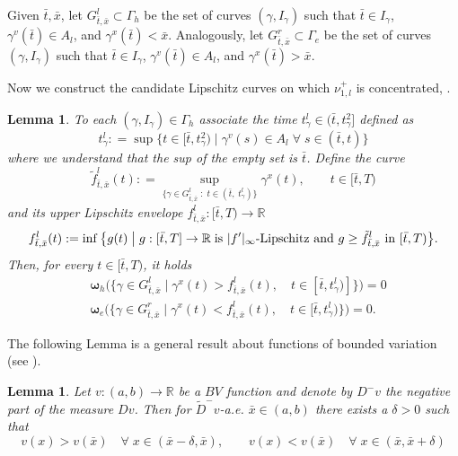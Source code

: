 \documentclass[11pt, twoside, reqno]{amsart}
\newtheorem{lemma}[thm]{Lemma}
\theoremstyle{definition}
\theoremstyle{remark}
\numberwithin{equation}{section}
\newcommand{\bs}[1]{\boldsymbol{#1}}
\begin{document}
Given $\bar t, \bar x$, let $G^l_{\bar t,\bar x}\subset \Gamma_h$ be the set of curves $(\gamma, I_{\gamma})$ such that $\bar t \in I_{\gamma}$, $\gamma^v(\bar t) \in A_l$, and $\gamma^x(\bar t) < \bar x$. Analogously, let $G^r_{\bar t,\bar x}\subset \Gamma_e$ be the set of curves $(\gamma, I_{\gamma})$ such that $\bar t \in I_{\gamma}$, $\gamma^v(\bar t) \in A_l$, and $\gamma^x(\bar t) > \bar x$.


Now we construct the candidate Lipschitz curves on which $\nu^+_{1,l}$ is concentrated, \cite[Corollary 7]{marconi_burgers}.
\begin{lemma}
 To each $(\gamma, I_{\gamma}) \in \Gamma_h$ associate the time $t_{\gamma}^l \in (\bar t, t^2_{\gamma}]$ defined as 
$$
t^l_{\gamma}: = \sup \big\{t \in [\bar t, t^2_{\gamma}) \; \big| \;\gamma^v(s) \in A_l \; \forall \; s \in (\bar t, t) \big\}
$$
where we understand that the sup of the empty set is $\bar t$.
Define the  curve
$$
    \tilde f_{\bar t, \bar x}^l(t) : = \sup_{\{\gamma \in G^l_{\bar t, \bar x} \; : \;  t \in (\bar t, \;  t^l_{\gamma})\}} \gamma^x(t), \qquad t \in [\bar t, T)
$$
and its upper Lipschitz envelope $f^l_{\bar t, \bar x} : [\bar t, T) \to \mathbb R$
\begin{equation}
    f^l_{\bar t, \bar x}(t) : = \inf \big\{g(t) \; \big| \;  g:[\bar t, T] \to \mathbb R \; \text{is $|f^{\prime}|_{\infty}$-Lipschitz and $g \geq \tilde f_{\bar t, \bar x}^l$ in $ [\bar t, T)$}\big\}. 
\end{equation}
Then, for every $t \in [\bar t, T)$, it holds
\begin{equation}
    \begin{aligned}
        &  \bs \omega_h\Big( \big\{ \gamma \in G^l_{\bar t, \bar x} \; \big| \; \gamma^x(t) > f^l_{\bar t, \bar x}(t), \quad t \in [\bar t, t^l_{\gamma})] \big\}\Big) = 0\\
        & \bs \omega_e\Big( \big\{ \gamma \in G^r_{\bar t, \bar x} \; \big| \; \gamma^x(t) < f^l_{\bar t, \bar x}(t), \quad t \in [\bar t, t^l_{\gamma}) \big\}\Big) = 0.
    \end{aligned}
\end{equation}
\end{lemma}
The following Lemma is a general result about functions of bounded variation (see \cite{AFP_book}).
\begin{lemma}\label{lemma:bvlemma}
Let $v : (a, b) \to \mathbb R$ be a $BV$ function and denote by $D^- v$ the negative part of the measure $D v$. Then for $\tilde D^- v$-a.e. $\bar x \in (a, b)$ there exists a $\delta > 0$ such that
    $$
    v(x) > v(\bar x) \quad \forall \; x \in (\bar x-\delta, \bar x), \qquad v(x) < v(\bar x) \quad \forall \; x \in (\bar x, \bar x +\delta)
    $$
\end{lemma}
\end{document}
